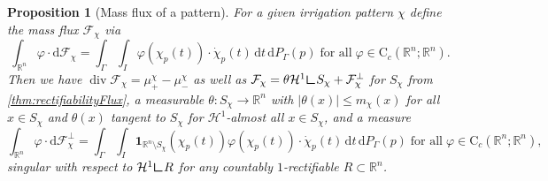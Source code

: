 \documentclass[10pt,a4paper,oneside,final]{article}
\newcommand{\R}{{\mathbb{R}}}
\newcommand{\de}{{\mathrm{d}}}
\DeclareMathOperator{\dv}{div}
\newcommand{\setchar}[1]{\mathbf{1}_{#1}}
\newcommand{\hdone}{\mathcal{H}^1}
\newcommand{\restr}{{\mbox{\LARGE$\llcorner$}}}
\newcommand{\cont}{{\mathrm{C}}}
\newcommand{\flux}{{\mathcal{F}}}
\newcommand{\reSpace}{\Gamma}
\newcommand{\reMeasure}{P_{\reSpace}}
\newcommand{\transportPath}{mass flux}
\newcommand{\TransportPath}{Mass flux}
\numberwithin{equation}{section}
\theoremstyle{plain}
\newtheorem{proposition}[theorem]{Proposition}
\theoremstyle{definition}
\theoremstyle{remark}
\begin{document}
\begin{proposition}[\TransportPath{} of a pattern]
For a given irrigation pattern $\chi$ define the \transportPath{} $\flux_\chi$ via
\begin{equation*}
\int_{\R^n}\varphi\cdot\de\flux_\chi=\int_\reSpace\int_I\varphi(\chi_p(t))\cdot\dot\chi_p(t)\,\de t\,\de \reMeasure(p) \;\text{for all}\; \varphi\in \cont_c(\R^n;\R^n).
\end{equation*}
Then we have $\dv\flux_\chi=\mu_+^\chi-\mu_-^\chi$ as well as
$\flux_\chi=\theta\hdone\restr S_\chi+\flux_\chi^\perp$ for $S_\chi$ from \cref{thm:rectifiabilityFlux}, a measurable $\theta:S_\chi\to\R^n$ with $|\theta(x)|\leq m_\chi(x)$ for all $x\in S_\chi$ and $\theta(x)$ tangent to $S_\chi$ for $\hdone$-almost all $x\in S_\chi$, and a measure
\begin{equation*}
\int_{\R^n}\varphi\cdot\de\flux_\chi^\perp=\int_\reSpace\int_I\setchar{\R^n\setminus S_\chi}(\chi_p(t))\varphi(\chi_p(t))\cdot\dot\chi_p(t)\,\de t\,\de \reMeasure(p) \;\text{for all}\; \varphi\in \cont_c(\R^n;\R^n),
\end{equation*}
singular with respect to $\hdone\restr R$ for any countably $1$-rectifiable $R\subset\R^n$.
\end{proposition}
\end{document}
